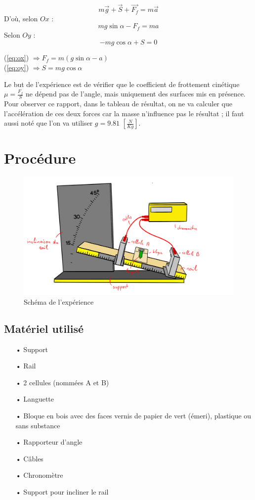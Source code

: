 \documentclass[twoside,twocolumn]{article}
\begin{document}
$$ m \vec{g} + \vec{S} + \vec{F_f} = m \vec{a} $$
D'où, selon $Ox$ :
\begin{equation}\label{eq:ox}
mg \sin \alpha - F_f = m a 
\end{equation}
Selon $Oy$ : 
\begin{equation}\label{eq:oy}
-mg \cos \alpha + S = 0 
\end{equation}
\begin{center}
(\ref{eq:ox}) $\Rightarrow F_f = m(g \sin \alpha - a)$\\
(\ref{eq:oy}) $\Rightarrow S = mg \cos \alpha $
\end{center}
Le but de l'expérience est de vérifier que le coefficient de frottement cinétique $\mu = \frac{F_f}{S}$ ne dépend pas de l'angle, mais uniquement des surfaces mis en présence. Pour observer ce rapport, dans le tableau de résultat, on ne va calculer que l'accélération de ces deux forces car la masse n'influence pas le résultat ; il faut aussi noté que l'on va utiliser $g = 9.81$ $\left[\frac{N}{Kg}\right]$.


\section{Procédure}
\begin{figure}[H]
\centering
\includegraphics[scale=0.125]{dessin_exp.png}
\caption{Schéma de l'expérience}
\end{figure}
\subsection{Matériel utilisé}
\begin{itemize}
\item[•] Support
\item[•] Rail
\item[•] 2 cellules (nommées A et B)
\item[•] Languette
\item[•] Bloque en bois avec des faces vernis de papier de vert (émeri), plastique ou sans substance
\item[•] Rapporteur d’angle
\item[•] Câbles
\item[•] Chronomètre
\item[•] Support pour incliner le rail
\end{itemize}
\end{document}
